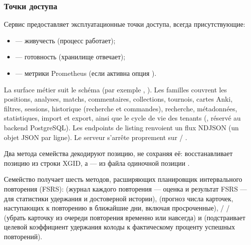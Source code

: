 \documentclass[letterpaper,10pt,russian]{sphinxmanual}
\begin{document}
\subsubsection{Точки доступа}
\label{\detokenize{mode_headless:points-d-acces}}
\sphinxAtStartPar
Сервис предоставляет эксплуатационные точки доступа, всегда присутствующие:
\begin{itemize}
\item {} 
\sphinxAtStartPar
{} — живучесть (процесс работает);

\item {} 
\sphinxAtStartPar
{} — готовность (хранилище отвечает);

\item {} 
\sphinxAtStartPar
{} — метрики Prometheus (если активна опция ).

\end{itemize}

\sphinxAtStartPar
La surface métier suit le schéma  (par exemple
, ). Les familles couvrent les
positions, analyses, matchs, commentaires, collections, tournois, cartes Anki,
filtres, sessions, historique (recherche et commandes), recherche,
métadonnées, statistiques, import et export, ainsi que le cycle de vie des
tenants (, réservé au backend PostgreSQL). Les endpoints de
listing renvoient un flux NDJSON (un objet JSON par ligne). Le serveur
s’arrête proprement sur  / .

\sphinxAtStartPar
Два метода семейства  декодируют позицию, не сохраняя её:  восстанавливает позицию из строки XGID, а  — из файла одиночной позиции .

\sphinxAtStartPar
Семейство  получает шесть методов, расширяющих планировщик интервального повторения (FSRS):  (журнал каждого повторения — оценка и результат FSRS — для статистики удержания и достоверной истории),  (прогноз числа карточек, наступающих к повторению в ближайшие дни, включая просроченные),  /  /  (убрать карточку из очереди повторения временно или навсегда) и  (подстраивает целевой коэффициент удержания колоды к фактическому проценту успешных повторений).
\end{document}
